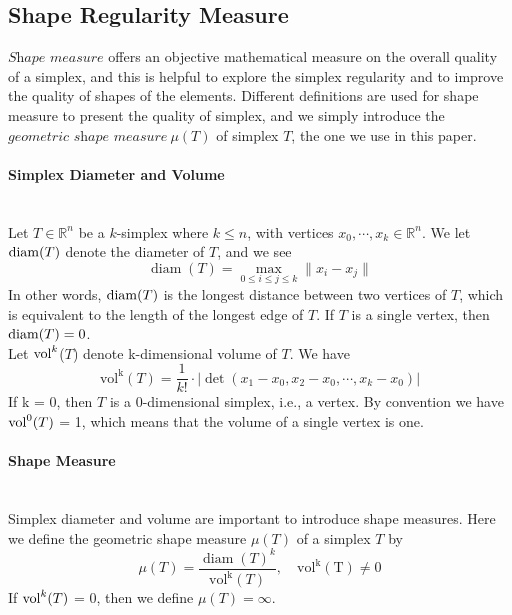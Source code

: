 \subsection{Shape Regularity Measure}%
    $\textit{Shape measure}$ offers an objective mathematical measure on the overall quality of a simplex, and this is helpful to explore the simplex regularity and to improve the quality of shapes of the elements. Different definitions are used for shape measure to present the quality of simplex, and we simply introduce the $\textit{geometric shape measure} ~\mu({T})$ of simplex ${T}$,  the one we use in this paper.

    \paragraph{Simplex Diameter and Volume}\mbox{}\\
    Let $T \in\mathbb{R}^n$ be a $k$-simplex where $k \leqslant n$, with vertices ${x}_0, \cdots, {x}_k \in\mathbb{R}^n$. We let $\operatorname{diam}(T)$ denote the diameter of $T$, and we see
    \begin{equation*}
    \operatorname{diam}(T) = \max_{0\leqslant i\leqslant j\leqslant k} \| x_i - x_j \|
    \end{equation*}
    In other words, $\operatorname{diam}(T)$ is the longest distance between two vertices of $T$, which is equivalent to the length of the longest edge of $T$. If $T$ is a single vertex, then $\operatorname{diam}(T) = 0$.\\

    \noindent
    Let $\operatorname{vol}^k$(${T}$) denote k-dimensional volume of ${T}$. We have
    \begin{equation*}
    \operatorname{vol^k} (T) = \frac{1}{k!}\cdot|\det(x_1-x_0, x_2-x_0,\cdots, x_k-x_0)|
    \end{equation*}
    \noindent
    If k = 0, then $T$ is a 0-dimensional simplex, i.e., a vertex. By convention we have $\operatorname{vol}^0 ({T})$ = 1, which means that the volume of a single vertex is one.

    
    \paragraph{Shape Measure}\mbox{}\\
    Simplex diameter and volume are important to introduce shape measures. Here we define the {geometric shape measure} $\mu(T)$ of a simplex $T$ by
    \begin{equation*}
    \mu(T) = \frac{\operatorname{diam}(T)^k}{\operatorname{vol^k}(T)}, \quad\operatorname{vol^k(T) \neq 0}
    \end{equation*}
    If $\operatorname{vol}^k(T)$ = 0, then we define $\mu(T) = \infty$.\\
    
